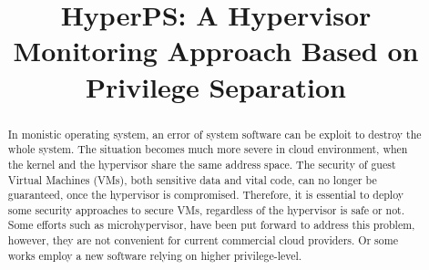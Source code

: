 ﻿\documentclass[conference]{IEEEtran}
\begin{document}
\title{HyperPS: A Hypervisor Monitoring Approach Based on Privilege Separation}

\author{
\IEEEauthorblockA{\textit{Institute of Information Engineering, Chinese Academy of Sciences} \\
\textit{School of Cyber Security, University of Chinese Academy of Sciences}\\
\{linkunli,liuwenqing\}@iie.ac.cn}
}
\maketitle

\begin{abstract}


\iffalse
In monistic operating system, an error of system software can be exploit to destroy the whole system. The situation becomes much more severe in cloud environment, when the kernel and the hypervisor share the same address space. The security of guest Virtual Machines (VMs), both sensitive data and vital code, can no longer be guaranteed, once the hypervisor is compromised. Therefore, it is essential to deploy some security approaches to secure VMs, regardless of the hypervisor is safe or not. Some efforts such as microhypervisor, have been put forward to address this problem, however, they are not convenient for current commercial cloud providers. Or some works employ a new software relying on higher privilege-level.


\end{abstract}
\end{document}
